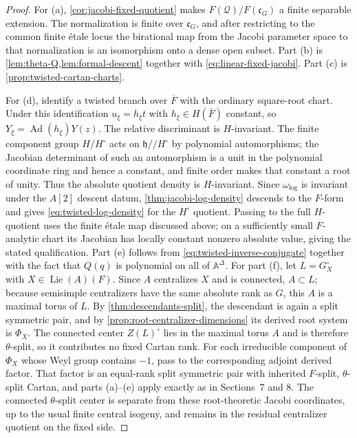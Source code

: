 \documentclass[11pt]{amsart}
\theoremstyle{definition}
\theoremstyle{remark}
\newcommand{\Fb}{\overline F}
\newcommand{\cQ}{\mathcal Q}
\newcommand{\A}{\mathbb A}
\newcommand{\Lie}{\operatorname{Lie}}
\newcommand{\Ad}{\operatorname{Ad}}
\newcommand{\cC}{\mathfrak c}
\newcommand{\h}{\mathfrak h}
\begin{document}
\begin{proof}
For \textup{(a)}, \cref{cor:jacobi-fixed-quotient} makes
$F(\cQ)/F(\cC_G)$ a finite separable extension.  The normalization is finite
over $\cC_G$, and after restricting to the common finite \'etale locus the
birational map from the Jacobi parameter space to that normalization is an
isomorphism onto a dense open subset.  Part
\textup{(b)} is \cref{lem:theta-Q,lem:formal-descent} together with
\eqref{eq:linear-fixed-jacobi}.  Part \textup{(c)} is
\cref{prop:twisted-cartan-charts}.

For \textup{(d)}, identify a twisted branch over $\Fb$ with the ordinary
square-root chart.  Under this identification
$u_\xi=h_\xi t$ with $h_\xi\in H(\Fb)$ constant, so
$Y_\xi=\Ad(h_\xi)Y(z)$.  The relative discriminant is $H$-invariant.  The
finite component group $H/H^\circ$ acts on $\h/\!/H^\circ$ by polynomial
automorphisms; the Jacobian determinant of such an automorphism is a unit in
the polynomial coordinate ring and hence a constant, and finite order makes
that constant a root of unity.  Thus the absolute quotient density is
$H$-invariant.  Since $\omega_{\log}$ is invariant under the $A[2]$ descent
datum, \cref{thm:jacobi-log-density} descends to the $F$-form and gives
\eqref{eq:twisted-log-density} for the $H^\circ$ quotient.  Passing to the
full $H$-quotient uses the finite \'etale map discussed above; on a sufficiently
small $F$-analytic chart its Jacobian has locally constant nonzero absolute
value, giving the stated qualification.  Part \textup{(e)} follows from
\eqref{eq:twisted-inverse-conjugate} together with the fact that $Q(q)$ is
polynomial on all of $\A^\Delta$.  For part \textup{(f)}, let
$L=G_X^\circ$ with $X\in\Lie(A)(F)$.  Since $A$ centralizes $X$ and is
connected, $A\subset L$; because semisimple centralizers have the same absolute
rank as $G$, this $A$ is a maximal torus of $L$.  By
\cref{thm:descendants-split}, the descendant is again a split symmetric pair,
and by \cref{prop:root-centralizer-dimensions} its derived root system is
$\Phi_X$.  The connected center $Z(L)^\circ$ lies in the maximal torus $A$
and is therefore $\theta$-split, so it contributes no fixed Cartan rank.
For each irreducible component of $\Phi_X$ whose Weyl group contains $-1$,
pass to the corresponding adjoint derived factor.  That factor is an
equal-rank split symmetric pair with inherited $F$-split, $\theta$-split
Cartan, and parts \textup{(a)}--\textup{(e)} apply exactly as in Sections~7
and 8.  The connected $\theta$-split center is separate from these
root-theoretic Jacobi coordinates, up to the usual finite central isogeny, and
remains in the residual centralizer quotient on the fixed side.
\end{proof}
\end{document}
